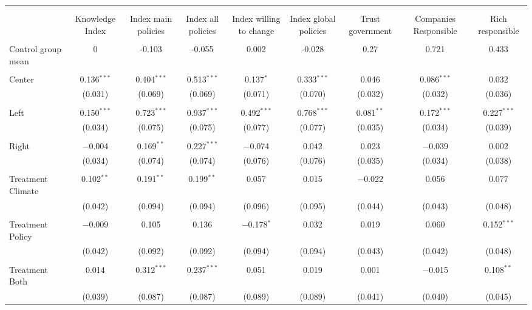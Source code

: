 
\begin{tabular}{@{\extracolsep{5pt}}lcccccccc} 
\\[-1.8ex]\hline 
\hline \\[-1.8ex] 
\\[-1.8ex] & Knowledge Index & Index main policies & Index all policies & Index willing to change & Index global policies & Trust government & Companies Responsible & Rich responsible \\ 
\hline \\[-1.8ex] 
 Control group mean & 0 & -0.103 & -0.055 & 0.002 & -0.028 & 0.27 & 0.721 & 0.433  \\ \hline \\[-1.8ex] Center & 0.136$^{***}$ & 0.404$^{***}$ & 0.513$^{***}$ & 0.137$^{*}$ & 0.333$^{***}$ & 0.046 & 0.086$^{***}$ & 0.032 \\ 
  & (0.031) & (0.069) & (0.069) & (0.071) & (0.070) & (0.032) & (0.032) & (0.036) \\ 
  & & & & & & & & \\ 
 Left & 0.150$^{***}$ & 0.723$^{***}$ & 0.937$^{***}$ & 0.492$^{***}$ & 0.768$^{***}$ & 0.081$^{**}$ & 0.172$^{***}$ & 0.227$^{***}$ \\ 
  & (0.034) & (0.075) & (0.075) & (0.077) & (0.077) & (0.035) & (0.034) & (0.039) \\ 
  & & & & & & & & \\ 
 Right & $-$0.004 & 0.169$^{**}$ & 0.227$^{***}$ & $-$0.074 & 0.042 & 0.023 & $-$0.039 & 0.002 \\ 
  & (0.034) & (0.074) & (0.074) & (0.076) & (0.076) & (0.035) & (0.034) & (0.038) \\ 
  & & & & & & & & \\ 
 Treatment Climate & 0.102$^{**}$ & 0.191$^{**}$ & 0.199$^{**}$ & 0.057 & 0.015 & $-$0.022 & 0.056 & 0.077 \\ 
  & (0.042) & (0.094) & (0.094) & (0.096) & (0.095) & (0.044) & (0.043) & (0.048) \\ 
  & & & & & & & & \\ 
 Treatment Policy & $-$0.009 & 0.105 & 0.136 & $-$0.178$^{*}$ & 0.032 & 0.019 & 0.060 & 0.152$^{***}$ \\ 
  & (0.042) & (0.092) & (0.092) & (0.094) & (0.094) & (0.043) & (0.042) & (0.048) \\ 
  & & & & & & & & \\ 
 Treatment Both & 0.014 & 0.312$^{***}$ & 0.237$^{***}$ & 0.051 & 0.019 & 0.001 & $-$0.015 & 0.108$^{**}$ \\ 
  & (0.039) & (0.087) & (0.087) & (0.089) & (0.089) & (0.041) & (0.040) & (0.045) \\ 

\end{tabular}
